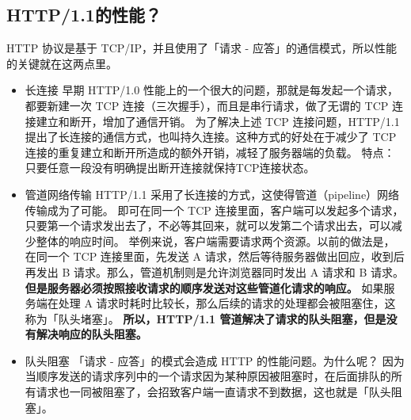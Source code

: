 \documentclass[11pt]{article}
\begin{document}
\subsection{HTTP/1.1的性能？}
\label{sec:org20fa0ed}
HTTP 协议是基于 TCP/IP，并且使用了「请求 - 应答」的通信模式，所以性能的关键就在这两点里。
\begin{itemize}
\item 长连接
早期 HTTP/1.0 性能上的一个很大的问题，那就是每发起一个请求，都要新建一次 TCP 连接（三次握手），而且是串行请求，做了无谓的 TCP 连接建立和断开，增加了通信开销。
为了解决上述 TCP 连接问题，HTTP/1.1 提出了长连接的通信方式，也叫持久连接。这种方式的好处在于减少了 TCP 连接的重复建立和断开所造成的额外开销，减轻了服务器端的负载。
特点：只要任意一段没有明确提出断开连接就保持TCP连接状态。
\item 管道网络传输
HTTP/1.1 采用了长连接的方式，这使得管道（pipeline）网络传输成为了可能。
即可在同一个 TCP 连接里面，客户端可以发起多个请求，只要第一个请求发出去了，不必等其回来，就可以发第二个请求出去，可以减少整体的响应时间。
举例来说，客户端需要请求两个资源。以前的做法是，在同一个 TCP 连接里面，先发送 A 请求，然后等待服务器做出回应，收到后再发出 B 请求。那么，管道机制则是允许浏览器同时发出 A 请求和 B 请求。
\textbf{但是服务器必须按照接收请求的顺序发送对这些管道化请求的响应。}
如果服务端在处理 A 请求时耗时比较长，那么后续的请求的处理都会被阻塞住，这称为「队头堵塞」。
\textbf{所以，HTTP/1.1 管道解决了请求的队头阻塞，但是没有解决响应的队头阻塞。}
\item 队头阻塞
「请求 - 应答」的模式会造成 HTTP 的性能问题。为什么呢？
因为当顺序发送的请求序列中的一个请求因为某种原因被阻塞时，在后面排队的所有请求也一同被阻塞了，会招致客户端一直请求不到数据，这也就是「队头阻塞」。
\end{itemize}
\end{document}
